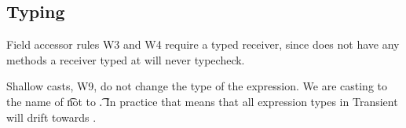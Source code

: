 \documentclass[a4paper,USenglish]{tex/lipics-v2016}
\begin{document}
\subsection{Typing}

Field accessor rules W3 and W4 require a typed receiver, since \any does
not have any methods a receiver typed at \any will never typecheck.

Shallow casts, W9, do not change the type of the expression. We are casting
to the name of \t not to \t.  In practice that means that all expression
types in Transient will drift towards \any.

~\\

\begin{mathpar}












\end{mathpar}
\end{document}
